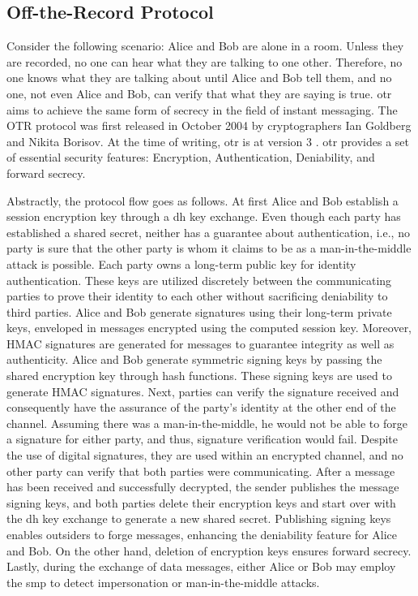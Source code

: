\subsection{Off-the-Record Protocol}
Consider the following scenario: Alice and Bob are alone in a room. Unless they are recorded, no one can hear what they are talking to one other. Therefore, no one knows what they are talking about until Alice and Bob tell them, and no one, not even Alice and Bob, can verify that what they are saying is true. \gls{otr} \cite{otr} aims to achieve the same form of secrecy in the field of instant messaging. The OTR protocol was first released in October 2004 by cryptographers Ian Goldberg and Nikita Borisov. At the time of writing, \gls{otr} is at version 3 \cite{otr3}. \gls{otr} provides a set of essential security features: Encryption, Authentication, Deniability, and forward secrecy.
\par
Abstractly, the protocol flow goes as follows. At first Alice and Bob establish a session encryption key through a \gls{dh} key exchange. Even though each party has established a shared secret, neither has a guarantee about authentication, i.e., no party is sure that the other party is whom it claims to be as a man-in-the-middle attack is possible. Each party owns a long-term public key for identity authentication. These keys are utilized discretely between the communicating parties to prove their identity to each other without sacrificing deniability to third parties. Alice and Bob generate signatures using their long-term private keys, enveloped in messages encrypted using the computed session key. Moreover, HMAC signatures are generated for messages to guarantee integrity as well as authenticity. Alice and Bob generate symmetric signing keys by passing the shared encryption key through hash functions. These signing keys are used to generate HMAC signatures. Next, parties can verify the signature received and consequently have the assurance of the party's identity at the other end of the channel. Assuming there was a man-in-the-middle, he would not be able to forge a signature for either party, and thus, signature verification would fail. Despite the use of digital signatures, they are used within an encrypted channel, and no other party can verify that both parties were communicating. After a message has been received and successfully decrypted, the sender publishes the message signing keys, and both parties delete their encryption keys and start over with the \gls{dh} key exchange to generate a new shared secret. Publishing signing keys enables outsiders to forge messages, enhancing the deniability feature for Alice and Bob. On the other hand, deletion of encryption keys ensures forward secrecy. Lastly, during the exchange of data messages, either Alice or Bob may employ the \gls{smp} \cite{smp} to detect impersonation or man-in-the-middle attacks.


